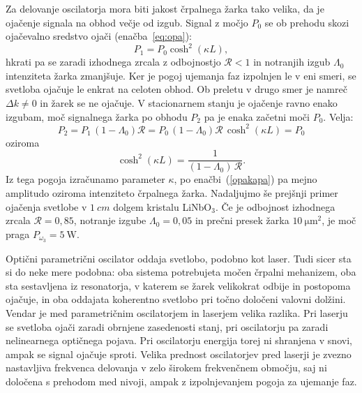 Za delovanje oscilatorja mora biti jakost črpalnega žarka tako velika, da je 
ojačenje signala na obhod večje od izgub. Signal z močjo 
$P_0$ se ob prehodu skozi ojačevalno sredstvo ojači (enačba~\ref{eq:opa}):
\begin{equation}
P_1 = P_0 \cosh^2 (\kappa L),
\end{equation}
hkrati pa se zaradi izhodnega zrcala z odbojnostjo $\mathcal{R}<1$ in notranjih izgub $\Lambda_0$ 
intenziteta žarka zmanjšuje. Ker je pogoj ujemanja faz izpolnjen le v eni smeri, se svetloba
ojačuje le enkrat na celoten obhod. Ob preletu v drugo smer je namreč $\Delta k \neq 0$ in 
žarek se ne ojačuje. V stacionarnem stanju je ojačenje ravno enako izgubam, moč 
signalnega žarka po obhodu $P_2$ pa je enaka začetni moči $P_0$. Velja:
\begin{equation}
P_2 = P_1\,(1-\Lambda_0)\mathcal{R} = P_0 \,(1-\Lambda_0) \mathcal{R} \,\cosh^2 (\kappa L) = P_0
\end{equation}
oziroma
\begin{equation}
\cosh^2 (\kappa L) =\frac{1}{(1-\Lambda_0)\, \mathcal{R}}.
\end{equation}
Iz tega pogoja izračunamo parameter $\kappa$, po enačbi~(\ref{opakapa}) pa mejno 
amplitudo oziroma intenziteto črpalnega žarka. Nadaljujmo še prejšnji primer ojačenja 
svetlobe v $1~\si{cm}$ dolgem kristalu LiNbO$_{3}$.
Če je odbojnost izhodnega zrcala $\mathcal{R}=0,85$, notranje izgube $\Lambda_0 = 0,05$ in prečni presek 
žarka $10~\si{\micro\metre^2}$, je moč praga $P_{\omega_3} = 5~\si{\watt}$.
\begin{remark}
Optični parametrični oscilator oddaja svetlobo, podobno kot laser. Tudi sicer
sta si do neke mere podobna: oba sistema potrebujeta močen črpalni mehanizem, oba 
sta sestavljena iz resonatorja, v katerem se žarek velikokrat odbije in postopoma ojačuje,
in oba oddajata koherentno svetlobo pri točno določeni valovni dolžini. Vendar
je med parametričnim oscilatorjem in laserjem velika razlika. Pri laserju se svetloba
ojači zaradi obrnjene zasedenosti stanj, pri oscilatorju pa 
zaradi nelinearnega optičnega pojava. Pri oscilatorju energija torej ni shranjena v
snovi, ampak se signal ojačuje sproti. Velika prednost oscilatorjev pred laserji 
je zvezno nastavljiva frekvenca delovanja v zelo širokem frekvenčnem območju, saj ni določena
s prehodom med nivoji, ampak z izpolnjevanjem pogoja za ujemanje faz.
\end{remark}

